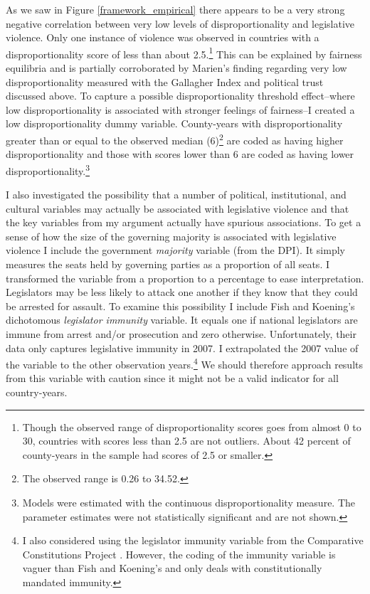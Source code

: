 \documentclass[a4paper]{article}\usepackage[]{graphicx}\usepackage[]{color}
\begin{document}
As we saw in Figure \ref{framework_empirical} there appears to be a very strong negative correlation between very low levels of disproportionality and legislative violence. Only one instance of violence was observed in countries with a disproportionality score of less than about 2.5.\footnote{Though the observed range of disproportionality scores goes from almost 0 to 30, countries with scores less than 2.5 are not outliers. About 42 percent of county-years in the sample had scores of 2.5 or smaller.} This can be explained by fairness equilibria and is partially corroborated by Marien's \citeyearpar{Marien2011} finding regarding very low disproportionality measured with the Gallagher Index and political trust discussed above. To capture a possible disproportionality threshold effect--where low disproportionality is associated with stronger feelings of fairness--I created a low disproportionality dummy variable. County-years with disproportionality greater than or equal to the observed median (6)\footnote{The observed range is 0.26 to 34.52.} are coded as having higher disproportionality and those with scores lower than 6 are coded as having lower disproportionality.\footnote{Models were estimated with the continuous disproportionality measure. The parameter estimates were not statistically significant and are not shown.}

I also investigated the possibility that a number of political, institutional, and cultural variables may actually be associated with legislative violence and that the key variables from my argument actually have spurious associations. To get a sense of how the size of the governing majority is associated with legislative violence I include the government {\emph{majority}} variable (from the DPI). It simply measures the seats held by governing parties as a proportion of all seats. I transformed the variable from a proportion to a percentage to ease interpretation. Legislators may be less likely to attack one another if they know that they could be arrested for assault. To examine this possibility I include Fish and Koening's \citeyearpar{Fish2009} dichotomous \emph{legislator immunity} variable. It equals one if national legislators are immune from arrest and/or prosecution and zero otherwise. Unfortunately, their data only captures legislative immunity in 2007. I extrapolated the 2007 value of the variable to the other observation years.\footnote{I also considered using the legislator immunity variable from the Comparative Constitutions Project \citep{ElkinsCCP2010}. However, the coding of the immunity variable is vaguer than Fish and Koening's and only deals with constitutionally mandated immunity.} We should therefore approach results from this variable with caution since it might not be a valid indicator for all country-years.
\end{document}
